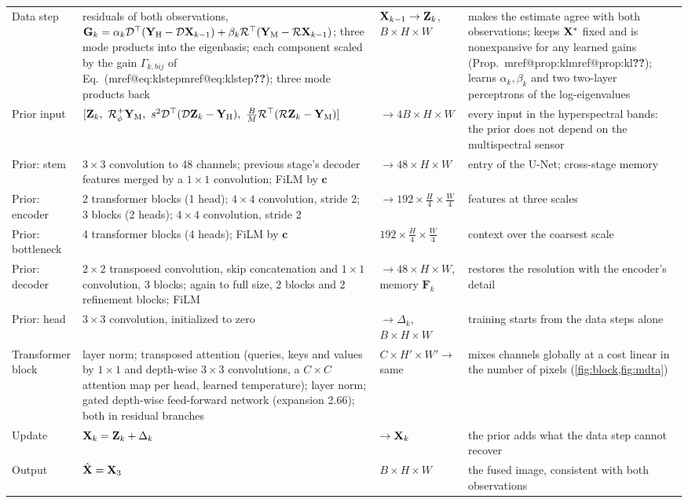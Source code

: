 \documentclass[10pt,twocolumn,letterpaper]{article}
\makeatletter
\newcommand{\mref}[1]{\ifcsname mref@#1\endcsname\csname mref@#1\endcsname\else\textbf{??}\fi}
\makeatother
\begin{document}
\begin{table}[t]
\begin{tabular}{@{}p{}p{}p{}p{}@{}}
Data step & residuals of both observations, $\mathbf{G}_k=\alpha_k\mathcal{D}^{\top}(\mathbf{Y}_{\mathrm{H}}-\mathcal{D}\mathbf{X}_{k-1})+\beta_k\mathcal{R}^{\top}(\mathbf{Y}_{\mathrm{M}}-\mathcal{R}\mathbf{X}_{k-1})$; three mode products into the eigenbasis; each component scaled by the gain $\Gamma_{k,bij}$ of Eq.~(\mref{eq:klstep}); three mode products back & $\mathbf{X}_{k-1}\rightarrow\mathbf{Z}_k$, $B\times H\times W$ & makes the estimate agree with both observations; keeps $\mathbf{X}^*$ fixed and is nonexpansive for any learned gains (Prop.~\mref{prop:kl}); learns $\alpha_k,\beta_k$ and two two-layer perceptrons of the log-eigenvalues \\
Prior input & $[\Z_k,\ \R_\phi^{+}\YM,\ s^2\D^{\top}(\D\Z_k-\YH),\ \tfrac{B}{M}\R^{\top}(\R\Z_k-\YM)]$ & $\rightarrow4B\times H\times W$ & every input in the hyperspectral bands: the prior does not depend on the multispectral sensor \\
Prior: stem & $3\times3$ convolution to 48 channels; previous stage's decoder features merged by a $1\times1$ convolution; FiLM by $\mathbf{c}$ & $\rightarrow48\times H\times W$ & entry of the U-Net; cross-stage memory \\
Prior: encoder & 2 transformer blocks (1 head); $4\times4$ convolution, stride 2; 3 blocks (2 heads); $4\times4$ convolution, stride 2 & $\rightarrow192\times\frac H4\times\frac W4$ & features at three scales \\
Prior: bottleneck & 4 transformer blocks (4 heads); FiLM by $\mathbf{c}$ & $192\times\frac H4\times\frac W4$ & context over the coarsest scale \\
Prior: decoder & $2\times2$ transposed convolution, skip concatenation and $1\times1$ convolution, 3 blocks; again to full size, 2 blocks and 2 refinement blocks; FiLM & $\rightarrow48\times H\times W$, memory $\mathbf{F}_k$ & restores the resolution with the encoder's detail \\
Prior: head & $3\times3$ convolution, initialized to zero & $\rightarrow\Delta_k$, $B\times H\times W$ & training starts from the data steps alone \\
Transformer block & layer norm; transposed attention (queries, keys and values by $1\times1$ and depth-wise $3\times3$ convolutions, a $C\times C$ attention map per head, learned temperature); layer norm; gated depth-wise feed-forward network (expansion 2.66); both in residual branches & $C\times H'\times W'\rightarrow$ same & mixes channels globally at a cost linear in the number of pixels (\cref{fig:block,fig:mdta}) \\
Update & $\mathbf{X}_k=\mathbf{Z}_k+\Delta_k$ & $\rightarrow\mathbf{X}_k$ & the prior adds what the data step cannot recover \\
\midrule
Output & $\hat{\mathbf{X}}=\mathbf{X}_3$ & $B\times H\times W$ & the fused image, consistent with both observations \\
\bottomrule
\end{tabular}
\end{table}
\end{document}
